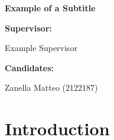 \documentclass[a4paper,12pt]{report}
\newcommand\blankpage{%
    \null
    \thispagestyle{empty}%
    \addtocounter{page}{-1}%
    \newpage}
\begin{document}
\begin{titlepage}
\begin{center}
\textbf{\large Example of a Subtitle}\\
\vfill

\raggedright\textbf{\large Supervisor:} \\
\raggedright\large Example Supervisor\\
\vfill
\raggedright\textbf{\large Candidates:} \\
\raggedright\large Zanella Matteo (2122187)\\
\vfill

\end{center}
\end{titlepage}

\clearpage{\pagestyle{plain}\cleardoublepage}
\tableofcontents


\clearpage{\pagestyle{plain}\cleardoublepage}

\clearpage{\pagestyle{plain}\cleardoublepage}
\chapter{Introduction}

\end{document}

